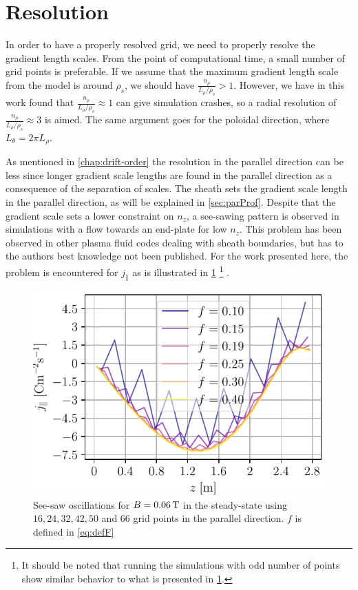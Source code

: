 \section{Resolution}
\label{sec:resolution}
%
In order to have a properly resolved grid, we need to properly resolve the gradient length scales.
From the point of computational time, a small number of grid points is preferable.
If we assume that the maximum gradient length scale from the model is around $\rho_s$, we should have $\frac{n_\rho}{L_\rho/\rho_s}>1$.
However, we have in this work found that $\frac{n_\rho}{L_\rho/\rho_s}\approx1$ can give simulation crashes, so a radial resolution of $\frac{n_\rho}{L_\rho/\rho_s}\approx3$ is aimed.
The same argument goes for the poloidal direction, where $L_\theta=2\pi L_\rho$.

As mentioned in \cref{chap:drift-order} the resolution in the parallel direction can be less since longer gradient scale lengths are found in the parallel direction as a consequence of the separation of scales.
The sheath sets the gradient scale length in the parallel direction, as will be explained in \cref{sec:parProf}.
Despite that the gradient scale sets a lower constraint on $n_z$, a see-sawing pattern is observed in simulations with a flow towards an end-plate for low $n_z$.
This problem has been observed in other plasma fluid codes dealing with sheath boundaries, but has to the authors best knowledge not been published.
For the work presented here, the problem is encountered for $j_\|$ as is illustrated in \cref{fig:see-saw}%
\footnote{It should be noted that running the simulations with odd number of points show similar behavior to what is presented in \cref{fig:see-saw}.}%
%
.
%
\begin{figure}[htb]
    \centering
    \includegraphics{fig/results/jParRipple006}
    \caption{See-saw oscillations for $B=0.06\, \text{T}$ in the steady-state using $16, 24, 32, 42, 50$ and $66$ grid points in the parallel direction.
        $f$ is defined in \cref{eq:defF}
    }
    \label{fig:see-saw}
\end{figure}
%


